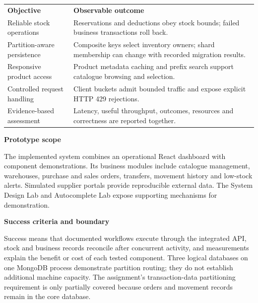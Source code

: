 \documentclass[11pt,a4paper]{article}
\newcommand{\ReportHeading}[1]{%
  \par\addvspace{4bp}%
  {\sffamily\bfseries\color{Navy}\fontsize{11.3bp}{15bp}\selectfont #1\par}%
  \nobreak\vspace{-2bp}}
\begin{document}
\noindent\begin{minipage}{\linewidth}
\setlength{\parskip}{0pt}
\begingroup\sffamily\fontsize{9.5bp}{12.350bp}\selectfont
\setlength{\tabcolsep}{5bp}\setlength{\extrarowheight}{6bp}
\renewcommand{\arraystretch}{1.15}
\begin{tabular}{>{\RaggedRight\arraybackslash}p{}>{\RaggedRight\arraybackslash}p{}}
\rowcolor{Navy}
\color{white}\bfseries Objective & \color{white}\bfseries Observable outcome \\
Reliable stock operations & Reservations and deductions obey stock bounds; failed business transactions roll back. \\
Partition-aware persistence & Composite keys select inventory owners; shard membership can change with recorded migration results. \\
Responsive product access & Product metadata caching and prefix search support catalogue browsing and selection. \\
Controlled request handling & Client buckets admit bounded traffic and expose explicit HTTP 429 rejections. \\
Evidence-based assessment & Latency, useful throughput, outcomes, resources and correctness are reported together. \\
\end{tabular}
\endgroup
\end{minipage}\par

\ReportHeading{1.3 Prototype scope}

The implemented system combines an operational React dashboard with component demonstrations. Its business
modules include catalogue management, warehouses, purchase and sales orders, transfers, movement history and
low-stock alerts. Simulated supplier portals provide reproducible external data. The System Design Lab and
Autocomplete Lab expose supporting mechanisms for demonstration.


\ReportHeading{1.4 Success criteria and boundary}

Success means that documented workflows execute through the integrated API, stock and business records reconcile
after concurrent activity, and measurements explain the benefit or cost of each tested component. Three logical
databases on one MongoDB process demonstrate partition routing; they do not establish additional machine
capacity. The assignment's transaction-data partitioning requirement is only partially covered because orders
and movement records remain in the core database.
\end{document}
